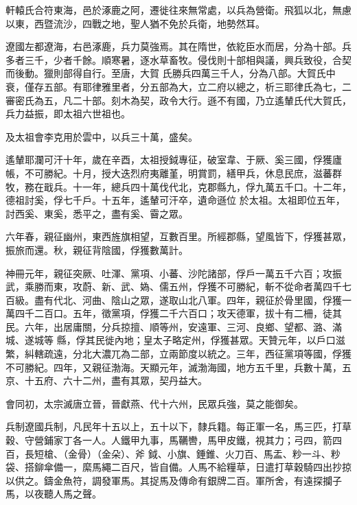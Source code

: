 
\begin{pinyinscope}

 軒轅氏合符東海，邑於涿鹿之阿，遷徙往來無常處，以兵為營衛。飛狐以北，無慮以東，西暨流沙，四戰之地，聖人猶不免於兵衛，地勢然耳。



 遼國左都遼海，右邑涿鹿，兵力莫強焉。其在隋世，依紇臣水而居，分為十部。兵多者三千，少者千餘。順寒暑，逐水草畜牧。侵伐則十部相與議，興兵致役，合契而後動。獵則部得自行。至唐，大賀
 氏勝兵四萬三千人，分為八部。大賀氏中衰，僅存五部。有耶律雅里者，分五部為大，立二府以總之，析三耶律氏為七，二審密氏為五，凡二十部。刻木為契，政令大行。遜不有國，乃立遙輦氏代大賀氏，兵力益振，即太祖六世祖也。



 及太祖會李克用於雲中，以兵三十萬，盛矣。



 遙輦耶瀾可汗十年，歲在辛酉，太祖授鉞專征，破室韋、于厥、奚三國，俘獲廬帳，不可勝紀。十月，授大迭烈府夷離堇，明賞罰，繕甲兵，休息民庶，滋蕃群牧，務在戢兵。十一年，總兵四十萬伐代北，克郡縣九，俘九萬五千口。十二年，德祖討奚，俘七千戶。十五年，遙輦可汗卒，遺命遜位
 於太祖。太祖即位五年，討西奚、東奚，悉平之，盡有奚、霫之眾。



 六年春，親征幽州，東西旌旗相望，互數百里。所經郡縣，望風皆下，俘獲甚眾，振旅而還。秋，親征背陰國，俘獲數萬計。



 神冊元年，親征突厥、吐渾、黨項、小蕃、沙陀諸部，俘戶一萬五千六百；攻振武，乘勝而東，攻蔚、新、武、媯、儒五州，俘獲不可勝紀，斬不從命者萬四千七百級。盡有代北、河曲、陰山之眾，遂取山北八軍。四年，親征於骨里國，俘獲一萬四千二百口。五年，徵黨項，俘獲二千六百口；攻天德軍，拔十有二柵，徒其民。六年，出居庸關，分兵掠擅、順等州，安遠軍、三河、良鄉、望都、潞、滿城、遂城等
 縣，俘其民徙內地；皇太子略定州，俘獲甚眾。天贊元年，以戶口滋繁，糾轄疏遠，分北大濃兀為二部，立兩節度以統之。三年，西征黨項等國，俘獲不可勝紀。四年，又親征渤海。天顯元年，滅渤海國，地方五千里，兵數十萬，五京、十五府、六十二州，盡有其眾，契丹益大。



 會同初，太宗滅唐立晉，晉獻燕、代十六州，民眾兵強，莫之能御矣。



 兵制遼國兵制，凡民年十五以上，五十以下，隸兵籍。每正軍一名，馬三匹，打草穀、守營鋪家丁各一人。人鐵甲九事，馬韉轡，馬甲皮鐵，視其力；弓四，箭四百，長短槍、（金骨）（金朵）、斧
 鉞、小旗、錘錐、火刀百、馬盂、粆一斗、粆袋、搭鉚傘備一，縻馬繩二百尺，皆自備。人馬不給糧草，日遣打草穀騎四出抄掠以供之。鑄金魚符，調發軍馬。其捉馬及傳命有銀牌二百。軍所舍，有遠探攔子馬，以夜聽人馬之聲。




\end{pinyinscope}
